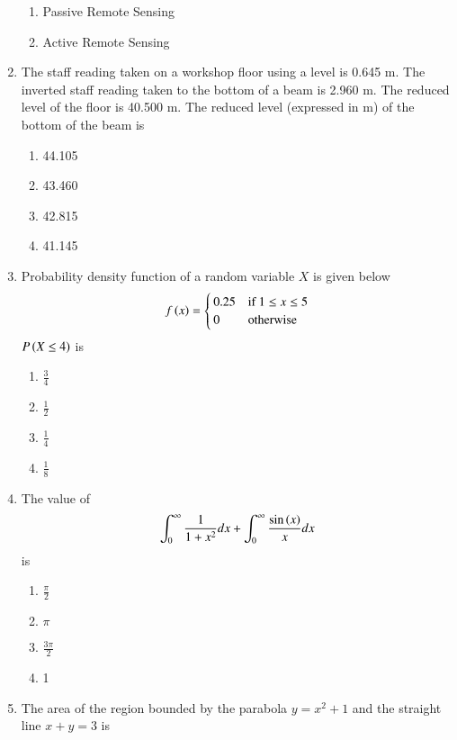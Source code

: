 \documentclass[journal]{IEEEtran}
\begin{document}
\begin{enumerate}
\begin{enumerate}
\item Passive Remote Sensing
\item Active Remote Sensing \\
\end{enumerate}
\item The staff reading taken on a workshop floor using a level is 0.645 m. The inverted staff reading taken to the bottom of a beam is 2.960 m. The reduced level of the floor is 40.500 m. The reduced level (expressed in m) of the bottom of the beam is 
\begin{enumerate}
    \item 44.105
    \item 43.460
    \item 42.815
    \item 41.145 \\
\end{enumerate}
\item Probability density function of a random variable $X$ is given below
\begin{align*}
    f\left(x\right) = \begin{cases}
        0.25 & \text{if}\ 1 \leq x \leq 5 \\
        0 & \text{otherwise}
    \end{cases}
\end{align*}
$P\left(X \leq 4\right)$ is
  \begin{enumerate}
   \item $\frac{3}{4}$
   \item $\frac{1}{2}$
   \item $\frac{1}{4}$
   \item $\frac{1}{8}$ \\
\end{enumerate}
\item The value of 
\begin{align*}
    \int_{0}^{\infty}\frac{1}{1 + x^2}dx + \int_{0}^{\infty}\frac{\sin\left(x\right)}{x}dx
\end{align*}
is
\begin{enumerate}
    \item $\frac{\pi}{2}$
    \item $\pi$
    \item $\frac{3\pi}{2}$
    \item 1 \\
\end{enumerate}
\item The area of the region bounded by the parabola $y = x^2 + 1$ and the straight line $x + y = 3$ is

\end{enumerate}
\end{document}
